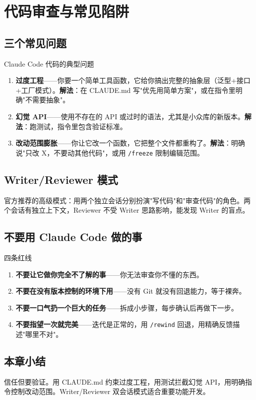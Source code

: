 \section{代码审查与常见陷阱}

\subsection{三个常见问题}

\begin{warningbox}{Claude Code 代码的典型问题}
\begin{enumerate}[leftmargin=1.5em]
  \item \textbf{过度工程}——你要一个简单工具函数，它给你搞出完整的抽象层（泛型+接口+工厂模式）。\textbf{解法}：在 CLAUDE.md 写"优先用简单方案"，或在指令里明确"不需要抽象"。
  \item \textbf{幻觉 API}——使用不存在的 API 或过时的语法，尤其是小众库的新版本。\textbf{解法}：跑测试，指令里包含验证标准。
  \item \textbf{改动范围膨胀}——你让它改一个函数，它把整个文件都重构了。\textbf{解法}：明确说"只改 X，不要动其他代码"，或用 \texttt{/freeze} 限制编辑范围。
\end{enumerate}
\end{warningbox}

\subsection{Writer/Reviewer 模式}

官方推荐的高级模式：用两个独立会话分别扮演"写代码"和"审查代码"的角色。两个会话有独立上下文，Reviewer 不受 Writer 思路影响，能发现 Writer 的盲点。

\subsection{不要用 Claude Code 做的事}

\begin{warningbox}{四条红线}
\begin{enumerate}[leftmargin=1.5em]
  \item \textbf{不要让它做你完全不了解的事}——你无法审查你不懂的东西。
  \item \textbf{不要在没有版本控制的环境下用}——没有 Git 就没有回退能力，等于裸奔。
  \item \textbf{不要一口气扔一个巨大的任务}——拆成小步骤，每步确认后再做下一步。
  \item \textbf{不要指望一次就完美}——迭代是正常的，用 \texttt{/rewind} 回退，用精确反馈描述"哪里不对"。
\end{enumerate}
\end{warningbox}

\subsection{本章小结}

信任但要验证。用 CLAUDE.md 约束过度工程，用测试拦截幻觉 API，用明确指令控制改动范围。Writer/Reviewer 双会话模式适合重要功能开发。

